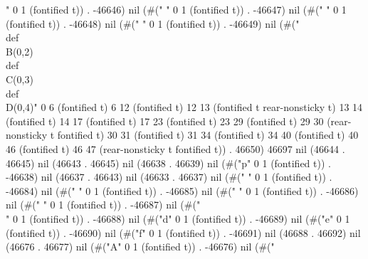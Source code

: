 " 0 1 (fontified t)) . -46646) nil (#(" " 0 1 (fontified t)) . -46647) nil (#(" " 0 1 (fontified t)) . -46648) nil (#(" " 0 1 (fontified t)) . -46649) nil (#("\\def\\B{(0,2)}
   \\def\\C{(0,3)}
   \\def\\D{(0,4)}" 0 6 (fontified t) 6 12 (fontified t) 12 13 (fontified t rear-nonsticky t) 13 14 (fontified t) 14 17 (fontified t) 17 23 (fontified t) 23 29 (fontified t) 29 30 (rear-nonsticky t fontified t) 30 31 (fontified t) 31 34 (fontified t) 34 40 (fontified t) 40 46 (fontified t) 46 47 (rear-nonsticky t fontified t)) . 46650) 46697 nil (46644 . 46645) nil (46643 . 46645) nil (46638 . 46639) nil (#("p" 0 1 (fontified t)) . -46638) nil (46637 . 46643) nil (46633 . 46637) nil (#("
" 0 1 (fontified t)) . -46684) nil (#(" " 0 1 (fontified t)) . -46685) nil (#(" " 0 1 (fontified t)) . -46686) nil (#(" " 0 1 (fontified t)) . -46687) nil (#("\\" 0 1 (fontified t)) . -46688) nil (#("d" 0 1 (fontified t)) . -46689) nil (#("e" 0 1 (fontified t)) . -46690) nil (#("f" 0 1 (fontified t)) . -46691) nil (46688 . 46692) nil (46676 . 46677) nil (#("A" 0 1 (fontified t)) . -46676) nil (#("
